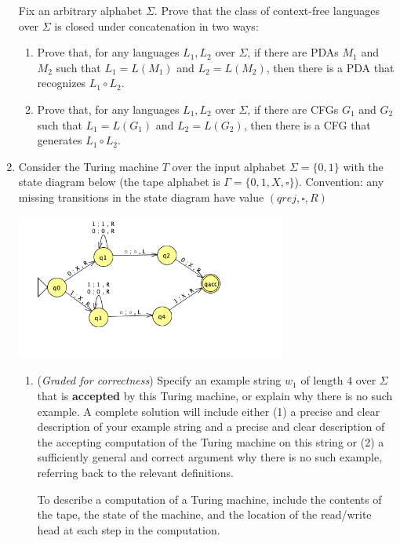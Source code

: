 \documentclass[12pt, oneside]{article}
\begin{document}
\begin{enumerate}
Fix an arbitrary alphabet $\Sigma$. 
Prove that the class of context-free languages over $\Sigma$ is closed under concatenation in two ways:
\begin{enumerate}
    \item Prove that, for any languages $L_1, L_2$ over $\Sigma$, if there 
    are PDAs $M_1$ and $M_2$ such that $L_1 = L(M_1)$ and $L_2 = L(M_2)$, then there is 
    a PDA that recognizes $L_1 \circ L_2$.
    \item Prove that, for any languages $L_1, L_2$ over $\Sigma$, if there 
    are CFGs $G_1$ and $G_2$ such that $L_1 = L(G_1)$ and $L_2 = L(G_2)$, then there is 
    a CFG that generates $L_1 \circ L_2$.
\end{enumerate}


\item Consider the Turing machine $T$ over the input alphabet $\Sigma = \{0,1\}$ with  the state
    diagram below (the tape alphabet is $\Gamma = \{ 0,1,X,\square\}$).  
    Convention:  any missing transitions in the state diagram have value $(qrej,\square,R)$
    \begin{center}
    \includegraphics[width=3.5in]{../../resources/machines/hw4TM.png}
    \end{center}
    \begin{enumerate}

        \item ({\it Graded for correctness}) Specify an example string $w_1$ of length $4$ over 
        $\Sigma$ that is {\bf accepted} by this Turing machine, or explain why there is no such 
        example. A complete solution will include either (1) a precise and clear 
        description of your example  string and a precise and clear description of the accepting computation
        of the Turing machine on this string or (2) a sufficiently
        general and correct argument why there is no such example, referring back to the relevant definitions.
        
        To describe a computation of a Turing machine, include the contents of the 
        tape, the state of the machine, and the location of the read/write head at each step in the computation.
        

\end{enumerate}
\end{enumerate}
\end{document}
